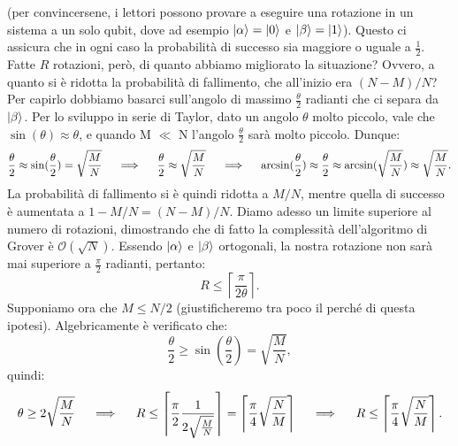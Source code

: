 \documentclass{book}
\theoremstyle{definition}
\theoremstyle{definition}
\theoremstyle{definition}
\theoremstyle{plain}
\theoremstyle{plain}
\theoremstyle{plain}
\theoremstyle{plain}
\begin{document}
(per convincersene, i lettori possono provare a eseguire una rotazione in un sistema a un solo qubit, dove ad esempio $\ket{\alpha} = \ket{0}$ e $\ket{\beta} = \ket{1}$). Questo ci assicura che in ogni caso la probabilità di successo sia maggiore o uguale a $\frac{1}{2}$. Fatte $R$ rotazioni, però, di quanto abbiamo migliorato la situazione? Ovvero, a quanto si è ridotta la probabilità di fallimento, che all'inizio era $(N-M)/N$? 
Per capirlo dobbiamo basarci sull'angolo di massimo $\frac{\theta}{2}$ radianti che ci separa da $\ket{\beta}$. Per lo sviluppo in serie di Taylor, dato un angolo $\theta$ molto piccolo, vale che $\sin(\theta) \approx \theta$, e quando M $\ll$ N l'angolo $\frac{\theta}{2}$ sarà molto piccolo. Dunque:
\begin{displaymath}
\frac{\theta}{2} \approx \sin(\frac{\theta}{2}) = \sqrt{\frac{M}{N}} \mkern20mu \implies \mkern20mu \frac{\theta}{2} \approx \sqrt{\frac{M}{N}} \mkern20mu \implies \mkern20mu \arcsin(\frac{\theta}{2}) \approx \frac{\theta}{2} \approx \arcsin(\sqrt{\frac{M}{N}}) \approx \sqrt{\frac{M}{N}}.
\end{displaymath}
La probabilità di fallimento si è quindi ridotta a $M/N$, mentre quella di successo è aumentata a $1 - M/N = (N - M)/N$.
Diamo adesso un limite superiore al numero di rotazioni, dimostrando che di fatto la complessità dell'algoritmo di Grover è $\mathcal{O}(\sqrt{N})$. 
Essendo $\ket{\alpha}$ e $\ket{\beta}$ ortogonali, la nostra rotazione non sarà mai superiore a $\frac{\pi}{2}$ radianti, pertanto:
\begin{displaymath}
R \leq \left\lceil \frac{\pi}{2 \theta} \right\rceil.
\end{displaymath}
Supponiamo ora che $M \leq N/2$ (giustificheremo tra poco il perché di questa ipotesi). Algebricamente è verificato che:
\begin{displaymath}
\frac{\theta}{2} \geq \sin(\frac{\theta}{2}) = \sqrt{\frac{M}{N}},
\end{displaymath}
quindi:
\begin{displaymath}
\theta \geq 2 \sqrt{\frac{M}{N}} \mkern20mu \implies \mkern20mu R \leq \left\lceil \frac{\pi}{2} \frac{1}{2 \sqrt{\frac{M}{N}}} \right\rceil = \left\lceil \frac{\pi}{4} \sqrt{\frac{N}{M}} \right\rceil \mkern20mu \implies \mkern20mu R \leq \left\lceil \frac{\pi}{4} \sqrt{\frac{N}{M}} \right\rceil.
\end{displaymath}
\end{document}
